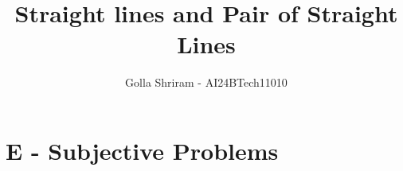 \documentclass[journal,12pt,twocolumn]{IEEEtran}
\theoremstyle{remark}
\begin{document}

\onecolumn
\vspace{3cm}
\title{Straight lines and Pair of Straight Lines}
\author{Golla Shriram - AI24BTech11010}

\maketitle

\renewcommand{\thefigure}{\theenumi}
\renewcommand{\thetable}{\theenumi}

\section{E - Subjective Problems}
                                                                           
\end{document}
